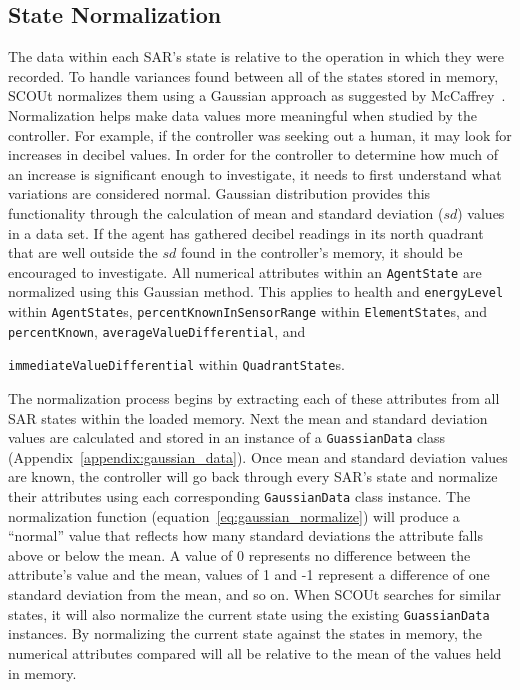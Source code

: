 \subsection{State Normalization}
The data within each SAR's state is relative to the operation in which they were recorded.
To handle variances found between all of the states stored in memory, SCOUt normalizes them using a Gaussian approach as suggested by McCaffrey~\cite{mccaffrey_how_nodate}.
Normalization helps make data values more meaningful when studied by the controller.
For example, if the controller was seeking out a human, it may look for increases in decibel values.
In order for the controller to determine how much of an increase is significant enough to investigate, it needs to first understand what variations are considered normal.
Gaussian distribution provides this functionality through the calculation of mean and standard deviation ($sd$) values in a data set.
If the agent has gathered decibel readings in its north quadrant that are well outside the $sd$ found in the controller's memory, it should be encouraged to investigate.
All numerical attributes within an \texttt{AgentState} are normalized using this Gaussian method.
This applies to health and \texttt{energyLevel} within \texttt{AgentState}s, \texttt{percentKnownInSensorRange} within \texttt{ElementState}s, and \texttt{percentKnown}, \texttt{averageValueDifferential}, and

\noindent
\texttt{immediateValueDifferential} within \texttt{QuadrantState}s.

The normalization process begins by extracting each of these attributes from all SAR states within the loaded memory.
Next the mean and standard deviation values are calculated and stored in an instance of a \texttt{GuassianData} class (Appendix~\ref{appendix:gaussian_data}).
Once mean and standard deviation values are known, the controller will go back through every SAR's state and normalize their attributes using each corresponding \texttt{GaussianData} class instance.
The normalization function (equation~\ref{eq:gaussian_normalize}) will produce a ``normal'' value that reflects how many standard deviations the attribute falls above or below the mean.
A value of 0 represents no difference between the attribute's value and the mean, values of 1 and -1 represent a difference of one standard deviation from the mean, and so on.
When SCOUt searches for similar states, it will also normalize the current state using the existing \texttt{GuassianData} instances.
By normalizing the current state against the states in memory, the numerical attributes compared will all be relative to the mean of the values held in memory.

